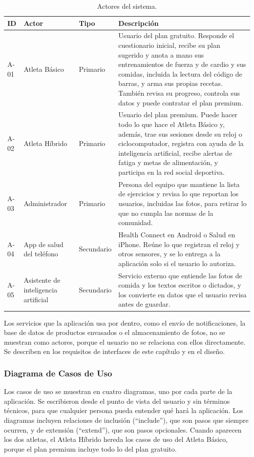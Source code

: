 \begin{table}[h!]
    \centering
    \renewcommand{\arraystretch}{1.3}
    \begin{tabular}{|p{1cm}|>{\raggedright\arraybackslash}p{3.5cm}|p{2cm}|p{8cm}|}
        \hline
        \rowcolor[HTML]{EFEFEF}
        \textbf{ID} & \textbf{Actor} & \textbf{Tipo} & \textbf{Descripción} \\ \hline
        A-01 & Atleta Básico & Primario & Usuario del plan gratuito. Responde el cuestionario inicial, recibe su plan sugerido y anota a mano sus entrenamientos de fuerza y de cardio y sus comidas, incluida la lectura del código de barras, y arma sus propias recetas. También revisa su progreso, controla sus datos y puede contratar el plan premium. \\ \hline
        A-02 & Atleta Híbrido & Primario & Usuario del plan premium. Puede hacer todo lo que hace el Atleta Básico y, además, trae sus sesiones desde su reloj o ciclocomputador, registra con ayuda de la inteligencia artificial, recibe alertas de fatiga y metas de alimentación, y participa en la red social deportiva. \\ \hline
        A-03 & Administrador & Primario & Persona del equipo que mantiene la lista de ejercicios y revisa lo que reportan los usuarios, incluidas las fotos, para retirar lo que no cumpla las normas de la comunidad. \\ \hline
        A-04 & App de salud del teléfono & Secundario & Health Connect en Android o Salud en iPhone. Reúne lo que registran el reloj y otros sensores, y se lo entrega a la aplicación solo si el usuario lo autoriza. \\ \hline
        A-05 & Asistente de inteligencia artificial & Secundario & Servicio externo que entiende las fotos de comida y los textos escritos o dictados, y los convierte en datos que el usuario revisa antes de guardar. \\ \hline
    \end{tabular}
    \caption{Actores del sistema.}
    \label{tab:actores}
\end{table}

Los servicios que la aplicación usa por dentro, como el envío de notificaciones, la base de datos de productos envasados o el almacenamiento de fotos, no se muestran como actores, porque el usuario no se relaciona con ellos directamente. Se describen en los requisitos de interfaces de este capítulo y en el diseño.

\subsubsection{Diagrama de Casos de Uso}
Los casos de uso se muestran en cuatro diagramas, uno por cada parte de la aplicación. Se escribieron desde el punto de vista del usuario y sin términos técnicos, para que cualquier persona pueda entender qué hará la aplicación. Los diagramas incluyen relaciones de inclusión (``include''), que son pasos que siempre ocurren, y de extensión (``extend''), que son pasos opcionales. Cuando aparecen los dos atletas, el Atleta Híbrido hereda los casos de uso del Atleta Básico, porque el plan premium incluye todo lo del plan gratuito.

